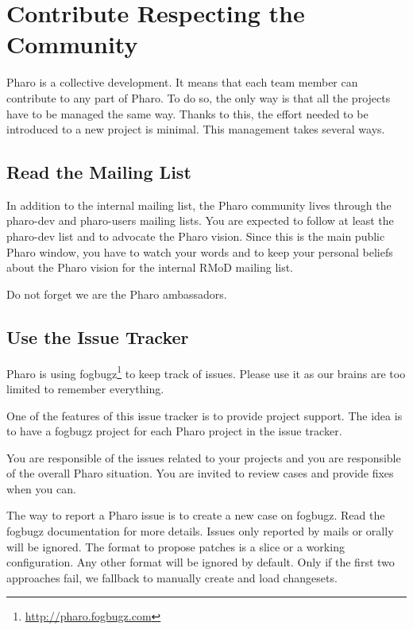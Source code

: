 \documentclass[10pt]{article}
\begin{document}
\section{Contribute Respecting the Community}



Pharo is a collective development. It means that each team member can contribute to any part of Pharo.
To do so, the only way is that all the projects have to be managed the same way.
Thanks to this, the effort needed to be introduced to a new project is minimal.
This management takes several ways.

\subsection{Read the Mailing List}

In addition to the internal mailing list, the Pharo community lives through the pharo-dev and pharo-users mailing lists. You are expected to follow at least the pharo-dev list and to advocate the Pharo vision. Since this is the main public Pharo window, you have to watch your words and to keep your personal beliefs about the Pharo vision for the internal RMoD mailing list.

Do not forget we are the Pharo ambassadors.

\subsection{Use the Issue Tracker}

Pharo is using fogbugz\footnote{\url{http://pharo.fogbugz.com}} to keep track of issues. Please use it as our brains are too limited to remember everything.

One of the features of this issue tracker is to provide project support. The idea is to have a fogbugz project for each Pharo project  in the issue tracker.

You are responsible of the issues related to your projects and you are responsible of the overall Pharo situation. You are invited to review cases and provide fixes when you can.

The way to report a Pharo issue is to create a new case on fogbugz. Read the fogbugz documentation for more details. Issues only reported by mails or orally will be ignored.
The format to propose patches is a slice or a working configuration. Any other format will be ignored by default. Only if the first two approaches fail, we fallback to manually create and load changesets.
\end{document}
